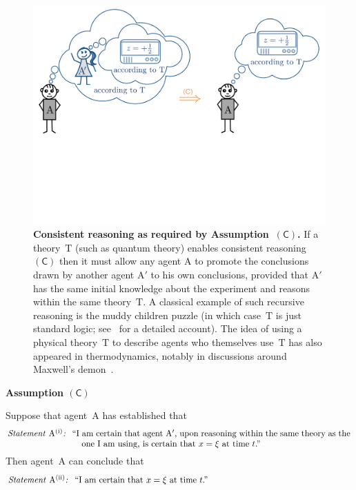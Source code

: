 \documentclass[12pt]{article}
\theoremstyle{mystyle}
\theoremstyle{definition}
\newcommand*{\Agent}{\mathrm{A}}
\newcommand*{\Agentp}{\mathrm{A'}}
\newcommand*{\Theory}{\mathrm{T}}
\newcommand*{\SelfCons}{\mathsf{(C)}}
\newcommand*{\asn}[1]{``#1''}
\newcommand*{\sT}[1]{{\text{\emph{Statement} $#1$\emph{:} }}}
\newcommand*{\sTM}[1]{\begin{minipage}{14cm} \hangindent=8.6em  #1 \end{minipage}}
\begin{document}
  \begin{figure}
\centering
\includegraphics[trim= 0.4cm  11.2cm 0.4cm 0.4cm, clip=true, scale=0.2]{SelfRefR.pdf}
\caption{{\bf Consistent reasoning as required by Assumption~$\SelfCons$.} If a theory~$\Theory$ (such as quantum theory) enables consistent reasoning~$\SelfCons$ then it must allow any agent $\Agent$ to promote the conclusions drawn by another agent $\Agentp$ to his own conclusions, provided that $\Agentp$ has the same initial knowledge about the experiment and reasons within the same theory~$\Theory$. A classical example of  such recursive reasoning is the muddy children puzzle (in which case~$\Theory$ is just standard logic; see~\cite{FHMV04} for a detailed account).  The idea of using a physical theory~$\Theory$ to describe agents who themselves use~$\Theory$ has also appeared in thermodynamics, notably in discussions around Maxwell's demon~\cite{Bennett82}.
\label{fig_selfreference}} 
\end{figure} 

\begin{emphbox}
  \noindent \textbf{Assumption $\SelfCons$} 
  
   \smallskip 
  
\noindent Suppose that agent~$\Agent$ has established that
\nsb
\begin{align*}
\sTM{\sT{{\Agent}^{\mathrm{(i)}}}  \asn{I am certain  that agent~$\Agentp$, upon reasoning within the same theory as the one I am using, is certain that $x=\xi$ at time $t$.} }
\end{align*}
 Then agent~$\Agent$ can conclude that \nsb
 \begin{align*}
\sTM{\sT{{\Agent}^{\mathrm{(ii)}}}  \asn{I am certain that $x=\xi$ at time $t$.}}
\end{align*}
\vspace{-4ex}
\end{emphbox}
\end{document}
